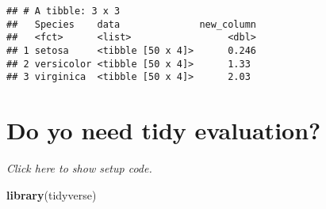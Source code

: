 \documentclass[]{book}
\newenvironment{Shaded}{\begin{snugshade}}{\end{snugshade}}
\newcommand{\ControlFlowTok}[1]{\textcolor[rgb]{0.13,0.29,0.53}{\textbf{#1}}}
\newcommand{\DataTypeTok}[1]{\textcolor[rgb]{0.13,0.29,0.53}{#1}}
\newcommand{\KeywordTok}[1]{\textcolor[rgb]{0.13,0.29,0.53}{\textbf{#1}}}
\newcommand{\NormalTok}[1]{#1}
\newcommand{\OperatorTok}[1]{\textcolor[rgb]{0.81,0.36,0.00}{\textbf{#1}}}
\newcommand{\StringTok}[1]{\textcolor[rgb]{0.31,0.60,0.02}{#1}}
\begin{document}
\begin{Shaded}
\end{Shaded}

\begin{verbatim}
## # A tibble: 3 x 3
##   Species    data              new_column
##   <fct>      <list>                 <dbl>
## 1 setosa     <tibble [50 x 4]>      0.246
## 2 versicolor <tibble [50 x 4]>      1.33 
## 3 virginica  <tibble [50 x 4]>      2.03
\end{verbatim}

\hypertarget{do-yo-need-tidy-evaluation}{%
\section{Do yo need tidy evaluation?}\label{do-yo-need-tidy-evaluation}}

\emph{Click here to show setup code.}

\begin{Shaded}
\begin{Highlighting}[]
\KeywordTok{library}\NormalTok{(tidyverse)}
\end{Highlighting}
\end{Shaded}

\begin{Shaded}
\end{Shaded}
\end{document}
